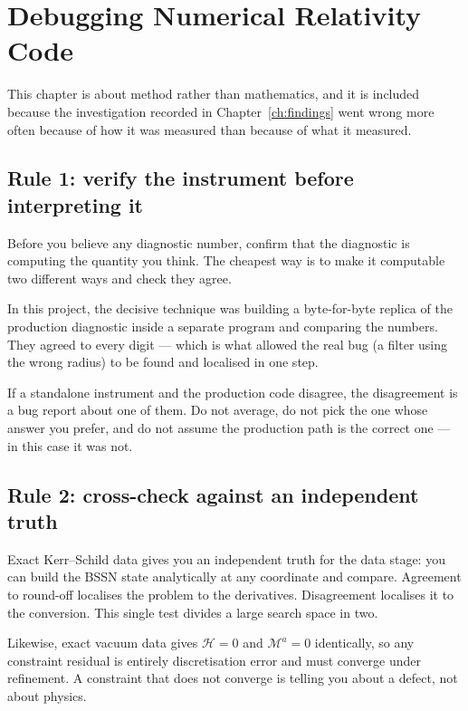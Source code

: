 \section{Debugging Numerical Relativity Code}
\label{ch:debug}

This chapter is about method rather than mathematics, and it is included
because the investigation recorded in Chapter~\ref{ch:findings} went wrong
more often because of how it was measured than because of what it measured.

\subsection{Rule 1: verify the instrument before interpreting it}

Before you believe any diagnostic number, confirm that the diagnostic is
computing the quantity you think. The cheapest way is to make it computable
two different ways and check they agree.

In this project, the decisive technique was building a byte-for-byte replica of
the production diagnostic inside a separate program and comparing the numbers.
They agreed to every digit --- which is what allowed the real bug (a filter
using the wrong radius) to be found and localised in one step.

\gotcha
If a standalone instrument and the production code disagree, the disagreement
is a bug report about one of them. Do not average, do not pick the one whose
answer you prefer, and do not assume the production path is the correct one ---
in this case it was not.

\subsection{Rule 2: cross-check against an independent truth}

Exact Kerr--Schild data gives you an independent truth for the data stage: you
can build the BSSN state analytically at any coordinate and compare. Agreement
to round-off localises the problem to the derivatives. Disagreement localises
it to the conversion. This single test divides a large search space in two.

Likewise, exact vacuum data gives $\mathcal{H} = 0$ and $\mathcal{M}^a = 0$
identically, so any constraint residual is entirely discretisation error and
must converge under refinement. A constraint that does not converge is telling
you about a defect, not about physics.

